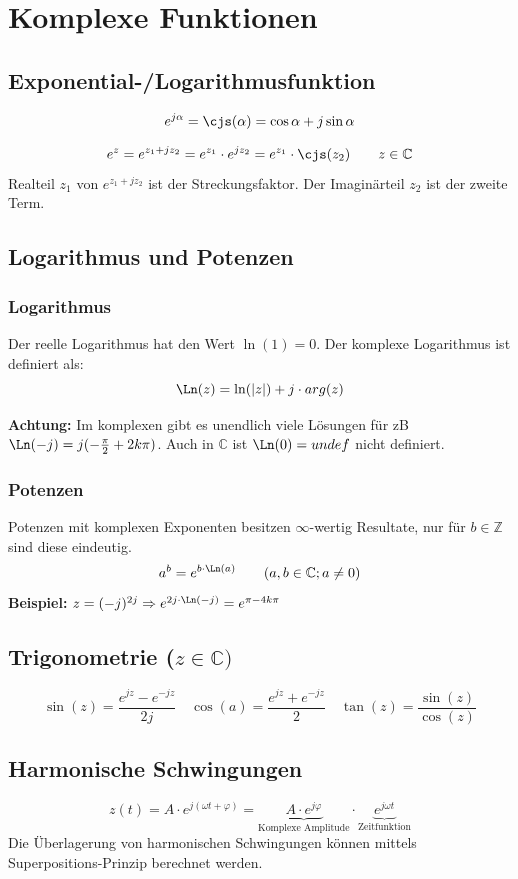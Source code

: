 \newpage
\section{Komplexe Funktionen}
\subsection{Exponential-/Logarithmusfunktion}\label{expfunc}
\[e^{j\alpha}= \cjs(\alpha) = \cos\alpha + j\sin\alpha\]

\[e^z= e^{z_1 + jz_2} = e^{z_1}\cdot e^{jz_2} = e^{z_1} \cdot \cjs(z_2) \qquad z \in \mathbb{C} \]
Realteil $z_1$ von $e^{z_1+jz_2}$ ist der Streckungsfaktor. Der Imaginärteil $z_2$ ist der zweite Term.

\subsection{Logarithmus und Potenzen}
\subsubsection{Logarithmus}\label{logfunc}
Der reelle Logarithmus hat den Wert $\ln(1) = 0$. Der komplexe Logarithmus ist definiert als:
\[\Ln(z) = \ln(\left|z\right|) + j\cdot arg(z) \]

\noindent\textbf{Achtung:} Im komplexen gibt es unendlich viele Lösungen für zB $\Ln(-j)= j(-\frac{\pi}{2} + 2k\pi)$. Auch in $\mathbb{C}$ ist $\Ln(0) = undef$ nicht definiert.

\subsubsection{Potenzen}\label{potfunc}
Potenzen mit komplexen Exponenten besitzen $\infty$-wertig Resultate, nur für $b \in \mathbb{Z}$ sind diese eindeutig.
\[
a^b = e^{b \cdot \Ln(a)} \qquad (a,b \in \mathbb{C};  a \neq 0)
\]
\textbf{Beispiel:} $z = (-j)^{2j} \Rightarrow e^{2j \cdot \Ln(-j)} = e^{\pi - 4k\pi}$

\subsection{Trigonometrie ($z \in \mathbb{C})$}
\[\sin(z) = \frac{e^{jz} -e^{-jz}}{2j} \quad \cos(a) = \frac{e^{jz} +e^{-jz}}{2} \quad \tan(z) = \frac{\sin(z)}{\cos(z)}\]

\subsection{Harmonische Schwingungen}
\[
z(t) = A \cdot e^{j(\omega t + \varphi)} = \underbrace{A \cdot e^{j\varphi}}_\text{Komplexe Amplitude} \cdot \underbrace{e^{j\omega t}}_{\text{Zeitfunktion}}
\]
\noindent Die Überlagerung von harmonischen Schwingungen können mittels Superpositions-Prinzip berechnet werden.

